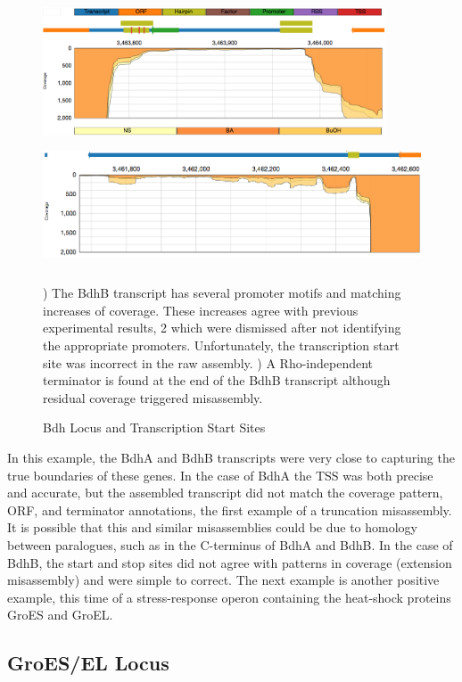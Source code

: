\begin{figure}
\small
{\includegraphics[width=\textwidth,height=1.5in]{images/Assembly/Examples/Bdh/BdhB-TSS.png}
\label{fig:5.14a}}
{\includegraphics[width=\textwidth,height=1.5in]{images/Assembly/Examples/Bdh/BdhB-termination.png}
\label{fig:5.14b}}
\caption{Bdh Locus and Transcription Start Sites}
) The BdhB transcript has several promoter motifs and matching increases of coverage. These increases agree with previous experimental results\cite{73}, 2 which were dismissed after not identifying the appropriate promoters. Unfortunately, the transcription start site was incorrect in the raw assembly. ) A Rho-independent terminator is found at the end of the BdhB transcript although residual coverage triggered misassembly.
\end{figure}

In this example, the BdhA and BdhB transcripts were very close to capturing the true boundaries of these genes. In the case of BdhA the TSS was both precise and accurate, but the assembled transcript did not match the coverage pattern, ORF, and terminator annotations, the first example of a truncation misassembly. It is possible that this and similar misassemblies could be due to homology between paralogues, such as in the C-terminus of BdhA and BdhB. In the case of BdhB, the start and stop sites did not agree with patterns in coverage (extension misassembly) and were simple to correct. The next example is another positive example, this time of a stress-response operon containing the heat-shock proteins GroES and GroEL.

\subsection{GroES/EL Locus}
